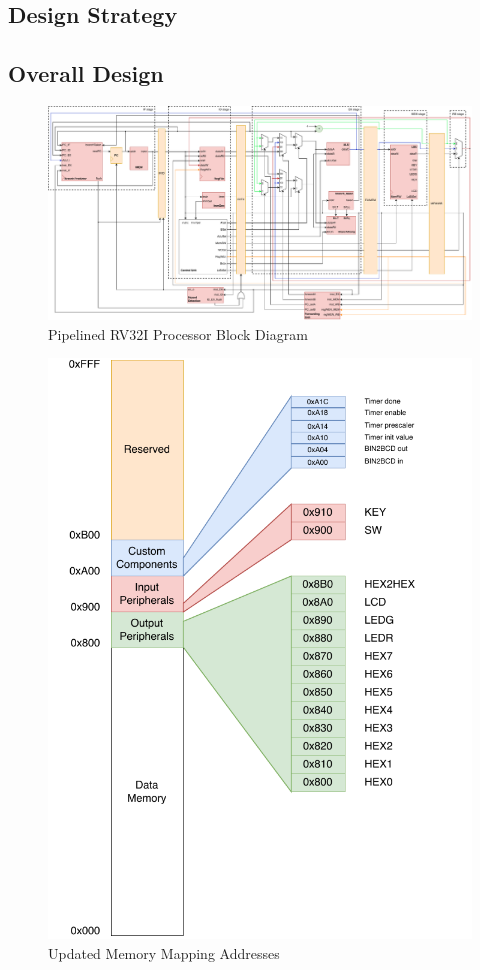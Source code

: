 \documentclass[12pt,a4paper,oneside]{book} %
\begin{document}
\begin{landscape}
\chapter{Design Strategy}
\section{Overall Design}
\begin{figure}[H]
    \centering
    \includegraphics[scale=.5]{images/top_diagram.pdf}
    \caption{Pipelined RV32I Processor Block Diagram}
    \label{top}
\end{figure}
\end{landscape}

\begin{figure}[H]
    \centering
    \includegraphics[width=.7\textwidth]{images/memmap.pdf}
    \caption{Updated Memory Mapping Addresses}
\end{figure}
\end{document}
